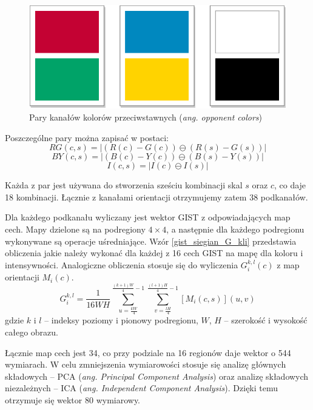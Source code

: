 \begin{figure}[h]
	\centering
	\includegraphics[scale=1.0]{graphics/01_podstawy_teoretyczne/gist-opponent-colors.pdf}
	\caption{ Pary kanałów kolorów przeciwstawnych (\emph{ang. opponent colors}) }
	\label{fig:gist-opponent-colors}
\end{figure}

Poszczególne pary można zapisać w postaci:
\begin{equation} 
\label{gist_siegian_RG} 
RG(c,s) = |(R(c) - G(c)) \ominus (R(s) - G(s))|
\end{equation}
\begin{equation} 
\label{gist_siegian_BY} 
BY(c, s) = |(B(c) - Y(c)) \ominus (B(s) - Y(s))|
\end{equation}
\begin{equation} 
\label{gist_siegian_I} 
I(c, s) = |I(c) \ominus I(s)|
\end{equation}

Każda z par jest używana do stworzenia sześciu kombinacji skal $s$ oraz $c$, co daje 18 kombinacji. Łącznie z kanałami orientacji otrzymujemy zatem 38 podkanałów.

Dla każdego podkanału wyliczany jest wektor GIST z odpowiadających map cech. Mapy dzielone są na podregiony $4 \times 4$, a następnie dla każdego podregionu wykonywane są operacje uśredniające. Wzór \ref{gist_siegian_G_kli} przedstawia obliczenia jakie należy wykonać dla każdej z 16 cech GIST na mapę dla koloru i intensywności. Analogiczne obliczenia stosuje się do wyliczenia $G_i^{k,l}(c)$ z map orientacji $M_i(c)$.
\begin{equation} 
\label{gist_siegian_G_kli} 
G_i^{k,l} = \frac{1}{16WH} \sum\limits_{u = \frac{kW}{4}}^{\frac{(k+1)W}{4} - 1} \sum\limits_{v = \frac{lH}{4}}^{\frac{(l+1)H}{4} - 1} [M_i(c, s)](u, v)
\end{equation} gdzie $k$ i $l$ -- indeksy poziomy i pionowy podregionu, $W$, $H$ -- szerokość i wysokość całego obrazu.

Łącznie map cech jest 34, co przy podziale na 16 regionów daje wektor o 544 wymiarach. W celu zmniejszenia wymiarowości stosuje się analizę głównych składowych -- PCA (\emph{ang. Principal Component Analysis}) oraz analizę składowych niezależnych -- ICA (\emph{ang. Independent Component Analysis}). Dzięki temu otrzymuje się wektor 80 wymiarowy.

